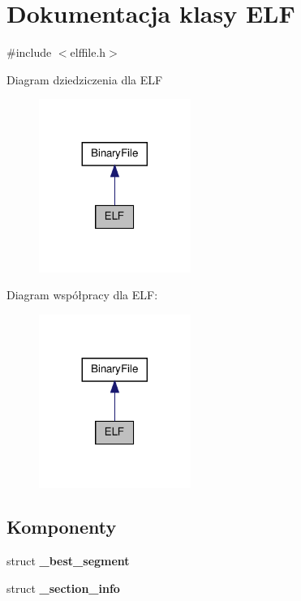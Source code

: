 \hypertarget{class_e_l_f}{\section{Dokumentacja klasy E\-L\-F}
\label{class_e_l_f}
}


{\ttfamily \#include $<$elffile.\-h$>$}



Diagram dziedziczenia dla E\-L\-F\nopagebreak
\begin{figure}[H]
\begin{center}
\leavevmode
\includegraphics[width=140pt]{class_e_l_f__inherit__graph}
\end{center}
\end{figure}


Diagram współpracy dla E\-L\-F\-:\nopagebreak
\begin{figure}[H]
\begin{center}
\leavevmode
\includegraphics[width=140pt]{class_e_l_f__coll__graph}
\end{center}
\end{figure}
\subsection*{Komponenty}
\begin{DoxyCompactItemize}
\item 
struct {\bfseries \-\_\-best\-\_\-segment}
\item 
struct {\bfseries \-\_\-section\-\_\-info}
\end{DoxyCompactItemize}
